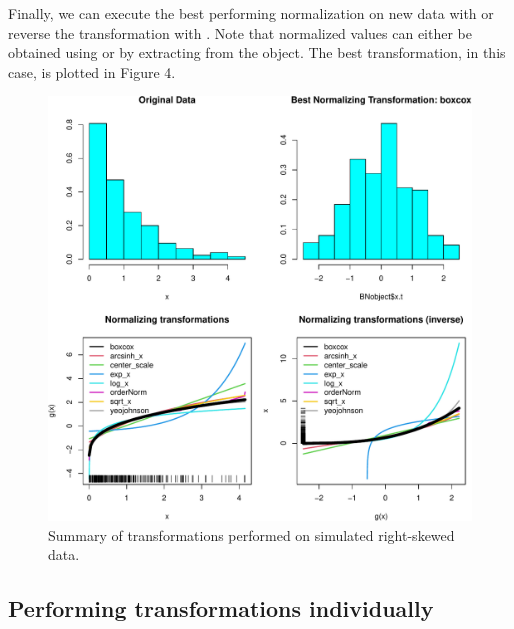 Finally, we can execute the best performing normalization on new data
with  or reverse the
transformation with
.
Note that normalized values can either be obtained using 
or by extracting  from the object. The best transformation, in
this case, is plotted in Figure 4.

\begin{Schunk}
\begin{figure}

{\centering \includegraphics[width=1\linewidth]{figs/histbest-1} 

}

\caption[Summary of transformations performed on simulated right-skewed data]{Summary of transformations performed on simulated right-skewed data.}\label{fig:histbest}
\end{figure}
\end{Schunk}

\hypertarget{performing-transformations-individually}{%
\subsection{Performing transformations
individually}\label{performing-transformations-individually}}

